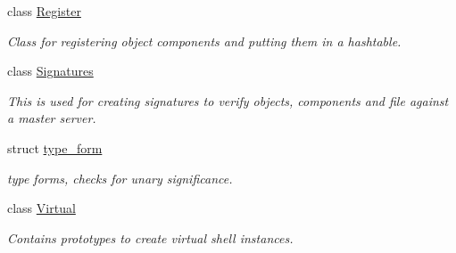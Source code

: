\begin{DoxyCompactItemize}
class \hyperlink{classcrunchy_1_1_register}{Register}
\begin{DoxyCompactList}\small\item\em Class for registering object components and putting them in a hashtable. \end{DoxyCompactList}\item 
class \hyperlink{classcrunchy_1_1_signatures}{Signatures}
\begin{DoxyCompactList}\small\item\em This is used for creating signatures to verify objects, components and file against a master server. \end{DoxyCompactList}\item 
struct \hyperlink{structcrunchy_1_1type__form}{type\+\_\+form}
\begin{DoxyCompactList}\small\item\em type forms, checks for unary significance. \end{DoxyCompactList}\item 
class \hyperlink{classcrunchy_1_1_virtual}{Virtual}
\begin{DoxyCompactList}\small\item\em Contains prototypes to create virtual shell instances. \end{DoxyCompactList}\end{DoxyCompactItemize}
